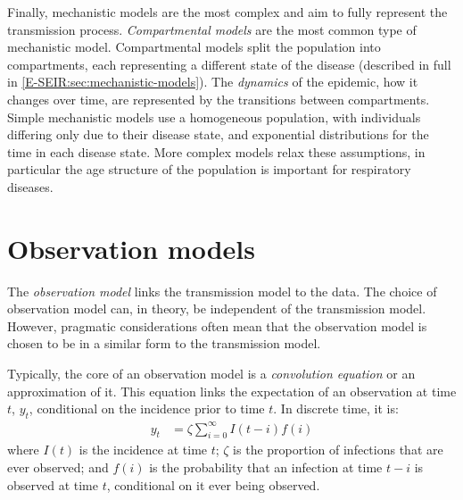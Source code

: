 \documentclass[thesis.tex]{subfiles}
\begin{document}
Finally, mechanistic models are the most complex and aim to fully represent the transmission process.
\emph{Compartmental models} are the most common type of mechanistic model.
Compartmental models split the population into compartments, each representing a different state of the disease (described in full in \cref{E-SEIR:sec:mechanistic-models}).
The \emph{dynamics} of the epidemic, how it changes over time, are represented by the transitions between compartments.
Simple mechanistic models use a homogeneous population, with individuals differing only due to their disease state, and exponential distributions for the time in each disease state.
More complex models relax these assumptions, in particular the age structure of the population is important for respiratory diseases.

\section{Observation models}


The \emph{observation model} links the transmission model to the data.
The choice of observation model can, in theory, be independent of the transmission model.
However, pragmatic considerations often mean that the observation model is chosen to be in a similar form to the transmission model.

Typically, the core of an observation model is a \emph{convolution equation} or an approximation of it.
This equation links the expectation of an observation at time $t$, $y_t$, conditional on the incidence prior to time $t$.
In discrete time, it is:
\begin{align}
    y_t &= \zeta \sum_{i=0}^\infty I(t-i) f(i)
\end{align}
where $I(t)$ is the incidence at time $t$; $\zeta$ is the proportion of infections that are ever observed; and $f(i)$ is the probability that an infection at time $t-i$ is observed at time $t$, conditional on it ever being observed.
\end{document}
